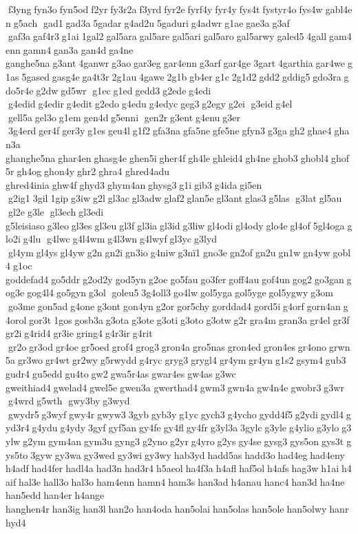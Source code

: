  f3yng fyn3o fyn5od f2yr fy3r2a f3yrd fyr2e fyrf4y fyr4y fys4t fystyr4o fys4w gabl4en g5ach  gad1 gad3a 5gadar g4ad2u 5gaduri g4adwr g1ae gae3a g3af  gaf3a gaf4r3 g1ai 1gal2 gal5ara gal5are gal5ari gal5aro gal5arwy galed5 4gall gam4enn gamn4 gan3a gan4d ga4ne 	ganghe5na g3ant 4ganwr g3ao gar3eg gar4enn g3arf gar4ge 3gart 4garthia gar4we g1as 5gased gasg4e ga4t3r 2g1au 4gawe 2g1b gb4er g1c 2g1d2 gdd2 gddig5 gdo3ra gdo5r4e g2dw gd5wr  g1ec g1ed gedd3 g2ede g4edi  g4edid g4edir g4edit g2edo g4edu g4edyc geg3 g2egy g2ei  g3eid g4el  gell5a gel3o g1em gen4d g5enni  gen2r g3ent g4enu g3er  3g4erd ger4f ger3y g1es geu4l g1f2 gfa3na gfa5ne gfe5ne gfyn3 g3ga gh2 ghae4 ghan3a 
ghanghe5na ghar4en ghasg4e ghen5i gher4f gh4le ghleid4 gh4ne ghob3 ghobl4 ghof5r gh4og ghon4y ghr2 ghra4 	ghred4adu 
ghred4inia ghw4f ghyd3 ghym4an ghysg3 g1i gib3 g4ida gi5en  g2ig1 3gil 1gip g3iw g2l gl3ac gl3adw glaf2 glan5e gl3ant glas3 g5las  g3lat gl5au  gl2e g3le  gl3ech gl3edi 
g5leisiaso g3leo gl3es gl3eu gl3f gl3ia gl3id g3liw gl4odi gl4ody glo4e gl4of 5gl4oga glo2i g4lu  g4lwc g4l4wm g4l3wn g4lwyf gl3yc g3lyd  gl4ym gl4ys gl4yw g2n gn2i gn3io g4niw g3nï1 gno3e gn2of gn2u gn1w gn4yw gobl4 g1oc 	goddefad4 go5ddr g2od2y god5yn g2oe go5fau go3fer goff4au gof4un gog2 go3gan gog3e gog4l4 go5gyn g3ol  goleu5 3g4oll3 go4lw gol5yga gol5yge gol5ygwy g3om  go3me gon5ad g4one g3ont gon4yn g2or gor5chy gorddad4 gord5i g4orf gorn4an g4orol gor3t 1gos gosb3a g3ota g3ote g3oti g3oto g3otw g2r gra4m gran3a gr4el gr3f gr2i g4rid4 gr3ie gring4 g4r3ir g4rit  gr2o gr3od gr4oe gr5oed grof4 grog3 gron4a gro5nas gron4ed gron4es gr4ono grwn5a gr3wo gr4wt gr2wy g5rwydd g4ryc gryg3 grygl4 gr4ym gr4yn g1s2 gsym4 gub3 gudr4 gu5edd gu4to gw2 gwa5r4as gwar4es gw4as g3wc 
gweithiad4 gwelad4 gwel5e gwen3a 	gwerthad4 gwm3 gwn4a gw4n4e gwobr3 g3wr  g4wrd g5wth  gwy3by g3wyd  gwydr5 g3wyf gwy4r gwyw3 3gyb gyb3y g1yc gych3 g4ycho gydd4f5 g2ydi gydl4 gyd3r4 g4ydu g4ydy 3gyf gyf5an gy4fe gy4fl gy4fr g3yl3a 3gylc g3yle g4ylio g3ylo g3ylw g2ym gym4an gym3u gyng3 g2yno g2yr g4yro g2ys gy4se gysg3 gys5on gys3t gys5to 3gyw gy3wa gy3wed gy3wi gy3wy hab3yd hadd5as hadd3o had4eg had4eny h4adf had4fer hadl4a had3n had3r4 h5aeol ha4f3a h4afl haf5ol h4afs hag3w h1ai h4aif hal3e hall3o hal3o ham4enn hamn4 ham3s han3ad h4anau hanc4 han3d ha4ne han5edd han4er h4ange 	hanghen4r han3ig han3l han2o han4oda han5olai han5olas han5ole han5olwy hanrhyd4 
